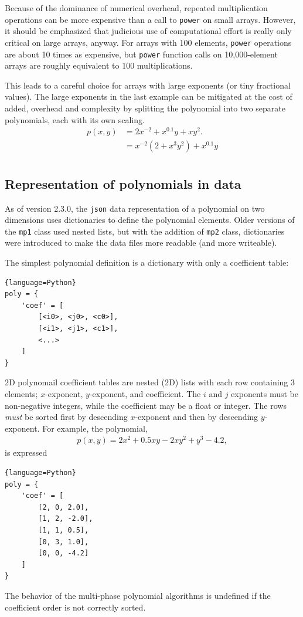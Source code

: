 Because of the dominance of numerical overhead, repeated multiplication operations can be more expensive than a call to \texttt{power} on small arrays.  However, it should be emphasized that judicious use of computational effort is really only critical on large arrays, anyway.  For arrays with 100 elements, \texttt{power} operations are about 10 times as expensive, but \texttt{power} function calls on 10,000-element arrays are roughly equivalent to 100 multiplications.

This leads to a careful choice for arrays with large exponents (or tiny fractional values).  The large exponents in the last example can be mitigated at the cost of added, overhead and complexity by splitting the polynomial into two separate polynomials, each with its own scaling.
\begin{align}
p(x,y) &= 2x^{-2} + x^{0.1}y + xy^2.\nonumber\\
 &= x^{-2} \left(2 + x^3y^2 \right) + x^{0.1} y\nonumber\\
\end{align}

\subsection{Representation of polynomials in data}

As of version 2.3.0, the \texttt{json} data representation of a polynomial on two dimensions uses dictionaries to define the polynomial elements.  Older versions of the \verb|mp1| class used nested lists, but with the addition of \verb|mp2| class, dictionaries were introduced to make the data files more readable (and more writeable).

The simplest polynomial definition is a dictionary with only a coefficient table:
\begin{lstlisting}{language=Python}
poly = {
    'coef' = [
        [<i0>, <j0>, <c0>],
        [<i1>, <j1>, <c1>],
        <...>
    ]
}
\end{lstlisting}
2D polynomail coefficient tables are nested (2D) lists with each row containing 3 elements; $x$-exponent, $y$-exponent, and coefficient.  The $i$ and $j$ exponents must be non-negative integers, while the coefficient may be a float or integer.  The rows \emph{must} be sorted first by descending $x$-exponent and then by descending $y$-exponent.  For example, the polynomial,
\begin{align}
p(x,y) = 2x^2 + 0.5 xy - 2xy^2 + y^3 - 4.2,
\end{align}
is expressed
\begin{lstlisting}{language=Python}
poly = {
    'coef' = [
        [2, 0, 2.0],
        [1, 2, -2.0],
        [1, 1, 0.5],
        [0, 3, 1.0],
        [0, 0, -4.2]
    ]
}
\end{lstlisting}
The behavior of the multi-phase polynomial algorithms is undefined if the coefficient order is not correctly sorted.

